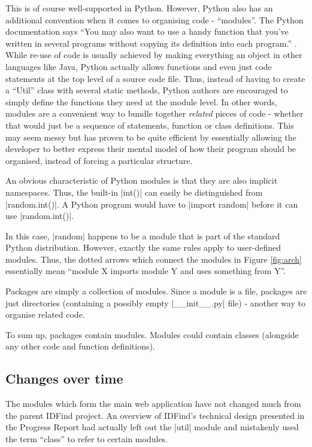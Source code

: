 This is of course well-supported in Python. However, Python also has an additional convention when it comes to organising code - ``modules''. The Python documentation says ``You may also want to use a handy function that you’ve written in several programs without copying its definition into each program.'' \cite{python-doc-modules}. While re-use of code is usually achieved by making everything an object in other languages like Java, Python actually allows functions and even just code statements at the top level of a source code file. Thus, instead of having to create a ``Util'' class with several static methods, Python authors are encouraged to simply define the functions they need at the module level. In other words, modules are a convenient way to bundle together \emph{related} pieces of code - whether that would just be a sequence of statements, function or class definitions. This may seem messy but has proven to be quite efficient by essentially allowing the developer to better express their mental model 
of how their program should be organised, instead of forcing a particular structure.

An obvious characteristic of Python modules is that they are also implicit namespaces. Thus, the built-in |int()| can easily be distinguished from |random.int()|. A Python program would have to |import random| before it can use |random.int()|.

In this case, |random| happens to be a module that is part of the standard Python distribution. However, exactly the same rules apply to user-defined modules. Thus, the dotted arrows which connect the modules in Figure \ref{fig:arch} essentially mean ``module X imports module Y and uses something from Y''.

Packages are simply a collection of modules. Since a module is a file, packages are just directories (containing a possibly empty |__init__.py| file) - another way to organise related code.

To sum up, packages contain modules. Modules could contain classes (alongside any other code and function definitions).


\subsection{Changes over time}
The modules which form the main web application have not changed much from the parent IDFind project. An overview of IDFind's technical design presented in the Progress Report \cite{progress-report} had actually left out the |util| module and mistakenly used the term ``class'' to refer to certain modules.

